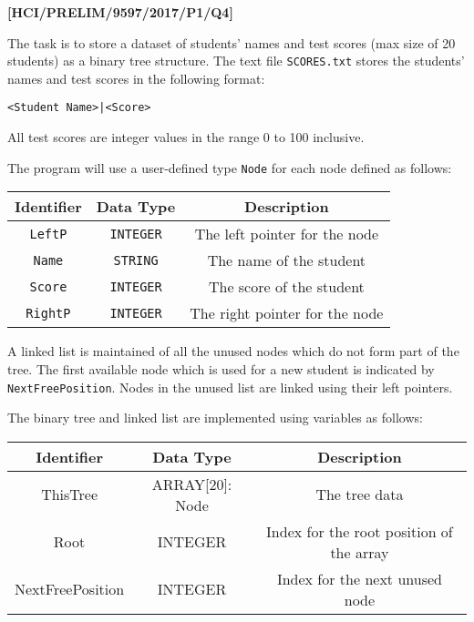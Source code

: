 \item \textbf{{[}HCI/PRELIM/9597/2017/P1/Q4{]} }

The task is to store a dataset of students\textquoteright{} names
and test scores (max size of 20 students) as a binary tree structure.
The text file \texttt{SCORES.txt} stores the students\textquoteright{}
names and test scores in the following format: 
\noindent \begin{center}
\texttt{<Student Name>|<Score> }
\par\end{center}

All test scores are integer values in the range 0 to 100 inclusive. 

The program will use a user-defined type \texttt{Node} for each node
defined as follows: 
\noindent \begin{center}
\begin{tabular}{|c|c|c|}
\hline 
\textbf{Identifier} & \textbf{Data Type} & \textbf{Description}\tabularnewline
\hline 
\texttt{LeftP} & \texttt{INTEGER} & The left pointer for the node\tabularnewline
\hline 
\texttt{Name} & \texttt{STRING} & The name of the student\tabularnewline
\hline 
\texttt{Score} & \texttt{INTEGER} & The score of the student\tabularnewline
\hline 
\texttt{RightP} & \texttt{INTEGER} & The right pointer for the node\tabularnewline
\hline 
\end{tabular}
\par\end{center}

A linked list is maintained of all the unused nodes which do not form
part of the tree. The first available node which is used for a new
student is indicated by \texttt{NextFreePosition}. Nodes in the unused
list are linked using their left pointers.

The binary tree and linked list are implemented using variables as
follows:
\noindent \begin{center}
\begin{tabular}{|c|c|c|}
\hline 
\textbf{Identifier} & \textbf{Data Type} & \textbf{Description}\tabularnewline
\hline 
ThisTree & ARRAY{[}20{]}: Node & The tree data\tabularnewline
\hline 
Root & INTEGER & Index for the root position of the array\tabularnewline
\hline 
NextFreePosition & INTEGER & Index for the next unused node\tabularnewline
\hline 
\end{tabular}
\par\end{center}

